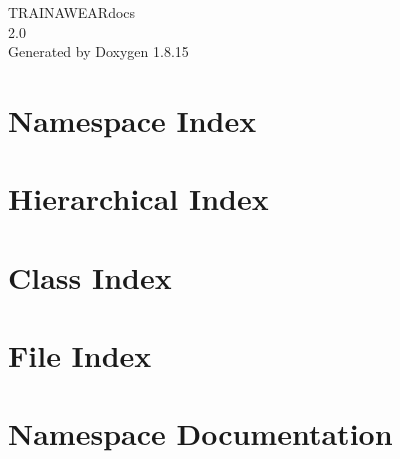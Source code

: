 \let\mypdfximage\pdfximage\def\pdfximage{\immediate\mypdfximage}\documentclass[twoside]{book}
\newcommand{\+}{\discretionary{\mbox{\scriptsize$\hookleftarrow$}}{}{}}
\newcommand{\clearemptydoublepage}{%
  \newpage{\pagestyle{empty}\cleardoublepage}%
}
\begin{document}
\hypersetup{pageanchor=false,
             bookmarksnumbered=true,
             pdfencoding=unicode
            }
\begin{titlepage}
\vspace*{7cm}
\begin{center}%
{\Large T\+R\+A\+I\+N\+A\+W\+E\+A\+Rdocs \\[1ex]\large 2.\+0 }\\
\vspace*{1cm}
{\large Generated by Doxygen 1.8.15}\\
\end{center}
\end{titlepage}
\clearemptydoublepage
{}
\tableofcontents
\clearemptydoublepage
{}
\hypersetup{pageanchor=true}

\chapter{Namespace Index}

\chapter{Hierarchical Index}

\chapter{Class Index}

\chapter{File Index}

\chapter{Namespace Documentation}



\end{document}
